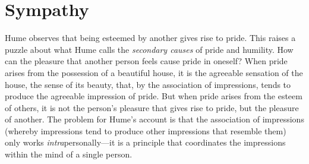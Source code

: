 % 



\section{Sympathy}\label{sec:sympathy} %

Hume observes that being esteemed by another gives rise to pride. This raises a puzzle about what Hume calls the \emph{secondary causes} of pride and humility. How can the pleasure that another person feels cause pride in oneself? When pride arises from the possession of a beautiful house, it is the agreeable sensation of the house, the sense of its beauty, that, by the association of impressions, tends to produce the agreeable impression of pride. But when pride arises from the esteem of others, it is not the person's pleasure that gives rise to pride, but the pleasure of another. The problem for Hume's account is that the association of impressions (whereby impressions tend to produce other impressions that resemble them) only works \emph{intra}personally---it is a principle that coordinates the impressions within the mind of a single person. \change

